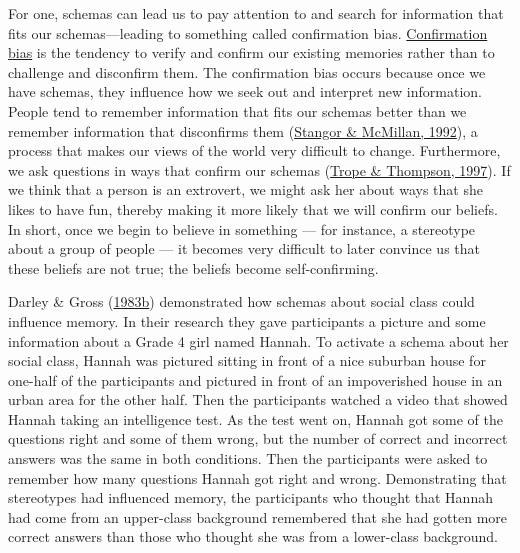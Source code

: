 \documentclass[
]{krantz}
\begin{document}
For one, schemas can lead us to pay attention to and search for information that fits our schemas---leading to something called confirmation bias. \protect\hyperlink{confirmation-bias}{Confirmation bias} is the tendency to verify and confirm our existing memories rather than to challenge and disconfirm them. The confirmation bias occurs because once we have schemas, they influence how we seek out and interpret new information. People tend to remember information that fits our schemas better than we remember information that disconfirms them (\protect\hyperlink{ref-stangor1992memory}{Stangor \& McMillan, 1992}), a process that makes our views of the world very difficult to change. Furthermore, we ask questions in ways that confirm our schemas (\protect\hyperlink{ref-trope1997looking}{Trope \& Thompson, 1997}). If we think that a person is an extrovert, we might ask her about ways that she likes to have fun, thereby making it more likely that we will confirm our beliefs. In short, once we begin to believe in something --- for instance, a stereotype about a group of people --- it becomes very difficult to later convince us that these beliefs are not true; the beliefs become self-confirming.

Darley \& Gross (\protect\hyperlink{ref-darley1983hypothesis}{1983b}) demonstrated how schemas about social class could influence memory. In their research they gave participants a picture and some information about a Grade 4 girl named Hannah. To activate a schema about her social class, Hannah was pictured sitting in front of a nice suburban house for one-half of the participants and pictured in front of an impoverished house in an urban area for the other half. Then the participants watched a video that showed Hannah taking an intelligence test. As the test went on, Hannah got some of the questions right and some of them wrong, but the number of correct and incorrect answers was the same in both conditions. Then the participants were asked to remember how many questions Hannah got right and wrong. Demonstrating that stereotypes had influenced memory, the participants who thought that Hannah had come from an upper-class background remembered that she had gotten more correct answers than those who thought she was from a lower-class background.
\end{document}
